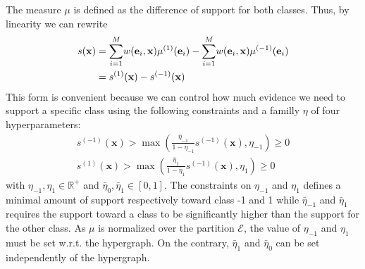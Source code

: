 \documentclass[preprint,12pt]{elsarticle}
\theoremstyle{definition}
\begin{document}
The measure $\mu$ is defined as the difference of support for both classes. Thus, by linearity we can rewrite
\begin{align}
 \begin{split}
s(\mathbf x) & = \underset{i = 1}{\overset{M}\sum} w(\mathbf {e}_i, \mathbf {x}) \mu^{(1)}(\mathbf {e}_i) - \underset{i = 1}{\overset{M}\sum} w(\mathbf {e}_i, \mathbf {x}) \mu^{(-1)}(\mathbf {e}_i) \\
           & = s^{(1)}(\mathbf x) - s^{(-1)}(\mathbf x)\hfill
 \end{split}
\end{align}
This form is convenient because we can control how much evidence we need to support a specific class using the following constraints and a familly $\eta$ of four hyperparameters:
\begin{subequations}
\begin{align}
  \tag{$C_0$}
  s^{(-1)}(\mathbf x) > \max(\frac{\bar \eta_{-1}}{1 - \bar \eta_{-1}}s^{(-1)}(\mathbf x), \eta_{-1}) \geq 0\label{eqn:n0} \\
  \tag{$C_1$}
  s^{(1)}(\mathbf x) > \max(\frac{\bar \eta_1}{1 - \bar \eta_1}s^{(-1)}(\mathbf x), \eta_1) \geq 0\label{eqn:n1}
\end{align}
\end{subequations} with $\eta_{-1}, \eta_1 \in \mathbb{R}^+$ and $\bar \eta_0, \bar \eta_1 \in [0,1]$.
The constraints on $\eta_{-1}$ and $\eta_1$ defines a minimal amount of support respectively toward class -1 and 1 while $\bar \eta_{-1}$ and $\bar \eta_1$ requires the support toward a class to be significantly higher than the support for the other class.
As $\mu$ is normalized over the partition $\mathcal E$, the value of $\eta_{-1}$ and $\eta_1$ must be set w.r.t. the hypergraph. On the contrary, $\bar \eta_1$ and $\bar \eta_0$ can be set independently of the hypergraph.
\end{document}
